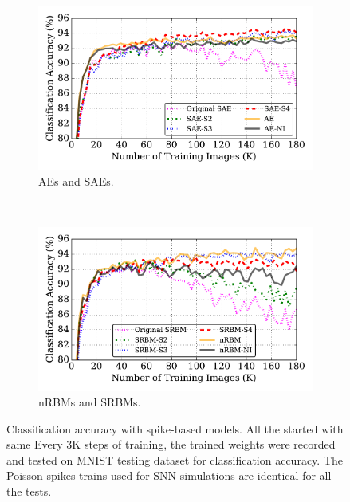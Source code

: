 \begin{figure}
	\centering
	\begin{subfigure}[t]{0.8\textwidth}
		\includegraphics[width=\textwidth]{pics_sdlm/43_MNIST_SAE_all/compare_result.pdf}
		\caption{AEs and SAEs.}
\end{subfigure}\\
	\begin{subfigure}[t]{0.8\textwidth}
		\includegraphics[width=\textwidth]{pics_sdlm/53_MNIST_SRBM_all/compare_result.pdf}
		\caption{nRBMs and SRBMs.}
\end{subfigure}
	\caption{Classification accuracy \protect{} \protect{} with \protect{} spike-based models. All the \protect{} \protect{} started with same \protect{} \protect{} Every 3K steps of training, the trained weights were recorded and tested on \protect{} MNIST testing dataset for classification accuracy. The Poisson spikes trains used for SNN simulations are identical for all the tests.}
	\label{fig:sdlm_ca}
\end{figure}
